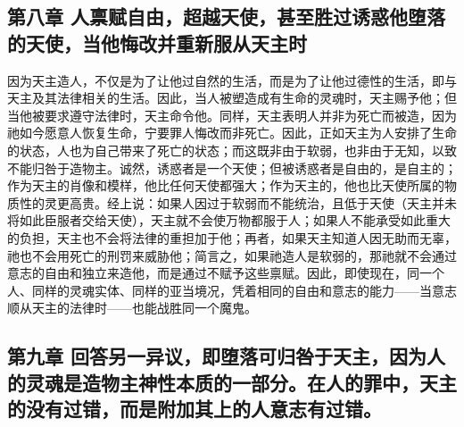 
\subsection{第八章  人禀赋自由，超越天使，甚至胜过诱惑他堕落的天使，当他悔改并重新服从天主时}

因为天主造人，不仅是为了让他过自然的生活，而是为了让他过德性的生活，即与天主及其法律相关的生活。因此，当人被塑造成有生命的灵魂时，天主赐予他；但当他被要求遵守法律时，天主命令他。同样，天主表明人并非为死亡而被造，因为祂如今愿意人恢复生命，宁要罪人悔改而非死亡。因此，正如天主为人安排了生命的状态，人也为自己带来了死亡的状态；而这既非由于软弱，也非由于无知，以致不能归咎于造物主。诚然，诱惑者是一个天使；但被诱惑者是自由的，是自主的；作为天主的肖像和模样，他比任何天使都强大；作为天主的，他也比天使所属的物质性的灵更高贵。经上说：如果人因过于软弱而不能统治，且低于天使（天主并未将如此臣服者交给天使），天主就不会使万物都服于人；如果人不能承受如此重大的负担，天主也不会将法律的重担加于他；再者，如果天主知道人因无助而无辜，祂也不会用死亡的刑罚来威胁他；简言之，如果祂造人是软弱的，那祂就不会通过意志的自由和独立来造他，而是通过不赋予这些禀赋。因此，即使现在，同一个人、同样的灵魂实体、同样的亚当境况，凭着相同的自由和意志的能力——当意志顺从天主的法律时——也能战胜同一个魔鬼。\par


\subsection{第九章  回答另一异议，即堕落可归咎于天主，因为人的灵魂是造物主神性本质的一部分。在人的罪中，天主的没有过错，而是附加其上的人意志有过错。}

